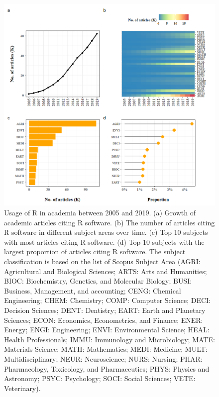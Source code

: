 \begin{Schunk}
\begin{figure}
\includegraphics[width=1\linewidth,height=0.5\textheight]{fig4} \caption[Usage of R in academia between 2005 and 2019]{Usage of R in academia between 2005 and 2019. (a) Growth of academic articles citing R software. (b) The number of articles citing R software in different subject areas over time. (c) Top 10 subjects with most articles citing R software. (d) Top 10 subjects with the largest proportion of articles citing R software. The subject classification is based on the list of Scopus Subject Area (AGRI: Agricultural and Biological Sciences; ARTS: Arts and Humanities; BIOC: Biochemistry, Genetics, and Molecular Biology; BUSI: Business, Management, and accounting; CENG: Chemical Engineering; CHEM: Chemistry; COMP: Computer Science; DECI: Decision Sciences; DENT: Dentistry; EART: Earth and Planetary Sciences; ECON: Economics, Econometrics, and Finance; ENER: Energy; ENGI: Engineering; ENVI: Environmental Science; HEAL: Health Professionals; IMMU: Immunology and Microbiology; MATE: Materials Science; MATH: Mathematics; MEDI: Medicine; MULT: Multidisciplinary; NEUR: Neuroscience; NURS: Nursing; PHAR: Pharmacology, Toxicology, and Pharmaceutics; PHYS: Physics and Astronomy; PSYC: Psychology; SOCI: Social Sciences; VETE: Veterinary). }\label{fig:fig4}
\end{figure}
\end{Schunk}

